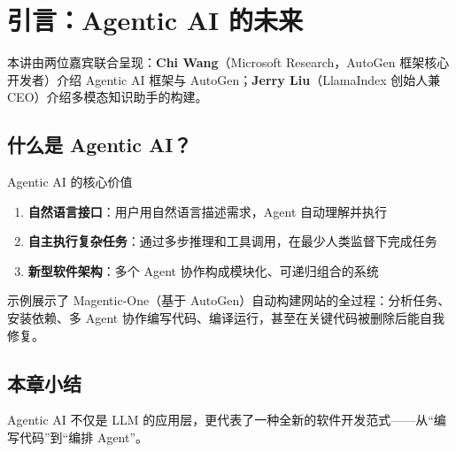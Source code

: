 \section{引言：Agentic AI 的未来}

本讲由两位嘉宾联合呈现：\textbf{Chi Wang}（Microsoft Research，AutoGen 框架核心开发者）介绍 Agentic AI 框架与 AutoGen；\textbf{Jerry Liu}（LlamaIndex 创始人兼 CEO）介绍多模态知识助手的构建。

\subsection{什么是 Agentic AI？}

\begin{importantbox}{Agentic AI 的核心价值}
\begin{enumerate}
    \item \textbf{自然语言接口}：用户用自然语言描述需求，Agent 自动理解并执行
    \item \textbf{自主执行复杂任务}：通过多步推理和工具调用，在最少人类监督下完成任务
    \item \textbf{新型软件架构}：多个 Agent 协作构成模块化、可递归组合的系统
\end{enumerate}
\end{importantbox}

示例展示了 Magentic-One（基于 AutoGen）自动构建网站的全过程：分析任务、安装依赖、多 Agent 协作编写代码、编译运行，甚至在关键代码被删除后能自我修复。

\subsection{本章小结}

Agentic AI 不仅是 LLM 的应用层，更代表了一种全新的软件开发范式——从``编写代码''到``编排 Agent''。

